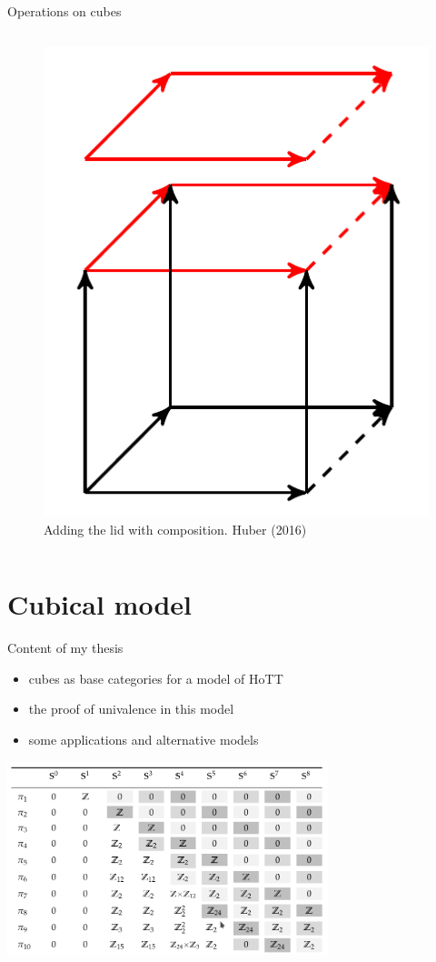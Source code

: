 \documentclass[english]{beamer}
\begin{document}
\begin{frame}{Operations on cubes}
\begin{columns}[c]
        \begin{figure}[h!]
                \includegraphics[height=.4\textheight]{figures/extension.png}
                \caption{Adding the lid with composition. Huber (2016)}
        \end{figure} 

        
\end{columns}
\end{frame}



\section{Cubical model}


\begin{frame}{Content of my thesis}

\begin{itemize}
\item cubes as base categories for a model of HoTT
\item the proof of univalence in this model
\item some applications and alternative models
\end{itemize}

\centering
\includegraphics[width=0.7\textwidth]{figures/groups}


\end{frame}
\end{document}
